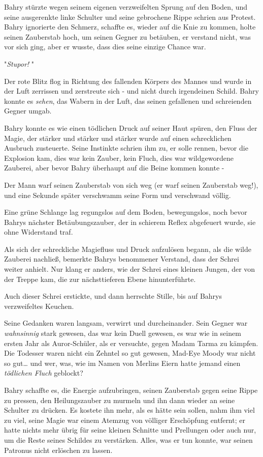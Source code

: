 {Bahry stürzte wegen seinem eigenen verzweifelten Sprung auf den Boden, und seine ausgerenkte linke Schulter und seine gebrochene Rippe schrien aus Protest. Bahry ignorierte den Schmerz, schaffte es, wieder auf die Knie zu kommen, holte seinen Zauberstab hoch, um seinen Gegner zu betäuben, er verstand nicht, was vor sich ging, aber er wusste, dass dies seine einzige Chance war.

"\emph{Stupor!} "

Der rote Blitz flog in Richtung des fallenden Körpers des Mannes und wurde in der Luft zerrissen und zerstreute sich - und nicht durch irgendeinen Schild. Bahry konnte es \emph{sehen}, das Wabern in der Luft, das seinen gefallenen und schreienden Gegner umgab.

Bahry konnte es wie einen tödlichen Druck auf seiner Haut spüren, den Fluss der Magie, der stärker und stärker und stärker wurde auf einen schrecklichen Ausbruch zusteuerte. Seine Instinkte schrien ihm zu, er solle rennen, bevor die Explosion kam, dies war kein Zauber, kein Fluch, dies war wildgewordene Zauberei, aber bevor Bahry überhaupt auf die Beine kommen konnte -

Der Mann warf seinen Zauberstab von sich weg (er warf seinen Zauberstab weg!), und eine Sekunde später verschwamm seine Form und verschwand völlig.

Eine grüne Schlange lag regungslos auf dem Boden, bewegungslos, noch bevor Bahrys nächster Betäubungszauber, der in schierem Reflex abgefeuert wurde, sie ohne Widerstand traf.

Als sich der schreckliche Magiefluss und Druck aufzulösen begann, als die wilde Zauberei nachließ, bemerkte Bahrys benommener Verstand, dass der Schrei weiter anhielt. Nur klang er anders, wie der Schrei eines kleinen Jungen, der von der Treppe kam, die zur nächsttieferen Ebene hinunterführte.

Auch dieser Schrei erstickte, und dann herrschte Stille, bis auf Bahrys verzweifeltes Keuchen.

Seine Gedanken waren langsam, verwirrt und durcheinander. Sein Gegner war \emph{wahnsinnig} stark gewesen, das war kein Duell gewesen, es war wie in seinem ersten Jahr als Auror-Schüler, als er versuchte, gegen Madam Tarma zu kämpfen. Die Todesser waren nicht ein Zehntel so gut gewesen, Mad-Eye Moody war nicht so gut… und wer, was, wie im Namen von Merlins Eiern hatte jemand einen \emph{tödlichen Fluch} geblockt?

Bahry schaffte es, die Energie aufzubringen, seinen Zauberstab gegen seine Rippe zu pressen, den Heilungszauber zu murmeln und ihn dann wieder an seine Schulter zu drücken. Es kostete ihn mehr, als es hätte sein sollen, nahm ihm viel zu viel, seine Magie war einem Atemzug von völliger Erschöpfung entfernt; er hatte nichts mehr übrig für seine kleinen Schnitte und Prellungen oder auch nur, um die Reste seines Schildes zu verstärken. Alles, was er tun konnte, war seinen Patronus nicht erlöschen zu lassen.

}
